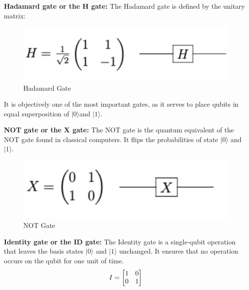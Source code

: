 \textbf{Hadamard gate or the H gate:} The Hadamard gate is defined by the unitary matrix:

\begin{figure}[h!]
      \centering
      \includegraphics[scale=0.7]{background/HGate.png}
      \caption{Hadamard Gate
      \citep{Khan2019}}
      \label{HGa}
\end{figure}


It is objectively one of the most important gates, as it serves to place qubits in equal superposition of  $\vert0\rangle $and  $\vert1\rangle $.


\vspace{0.5cm}
\textbf{NOT gate or the X gate:} The NOT gate is the quantum equivalent of the NOT gate found in classical computers. It  flips the probabilities of state $\vert0\rangle $ and  $\vert1\rangle $.

\begin{figure}[H]
      \centering
      \includegraphics[scale=0.7]{background/NotGate.png}
      \caption{NOT Gate
      \citep{Khan2019}}
      \label{NotGa}
\end{figure}

\textbf{Identity gate or the ID gate:} The Identity gate is a single-qubit operation that leaves the basis states $\vert0\rangle $ and  $\vert1\rangle $ unchanged. It ensures that no operation occurs on the qubit for one unit of time.
\begin{equation*}
\centering
I = 
\begin{bmatrix}
1 & 0 \\
0 & 1
\end{bmatrix}
\end{equation*}

